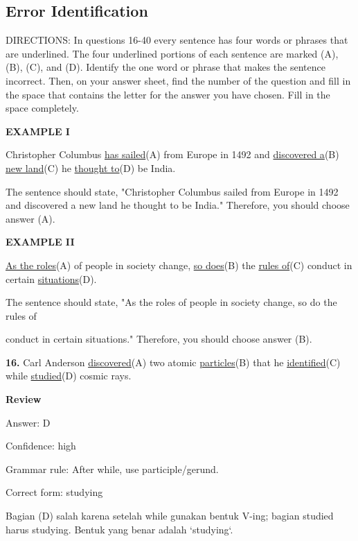 \documentclass[12pt]{article}
\begin{document}
\subsection*{Error Identification}
DIRECTIONS: In questions 16-40 every sentence has four words or phrases that are underlined. The four underlined portions of each sentence are marked (A), (B), (C), and (D). Identify the one word or phrase that makes the sentence incorrect. Then, on your answer sheet, find the number of the question and fill in the space that contains the letter for the answer you have chosen. Fill in the space completely.\par
\begin{exampleblock}
\textbf{EXAMPLE I}\par
Christopher Columbus \uline{has sailed}(A) from Europe in 1492 and \uline{discovered a}(B) \uline{new land}(C) he \uline{thought to}(D) be India.\par
The sentence should state, "Christopher Columbus sailed from Europe in 1492 and discovered a new land he thought to be India." Therefore, you should choose answer (A).\par
\end{exampleblock}
\begin{exampleblock}
\textbf{EXAMPLE II}\par
\uline{As the roles}(A) of people in society change, \uline{so does}(B) the \uline{rules of}(C) conduct in certain \uline{situations}(D).\par
The sentence should state, "As the roles of people in society change, so do the rules of\par
conduct in certain situations." Therefore, you should choose answer (B).\par
\end{exampleblock}
\noindent\textbf{16.} Carl Anderson \uline{discovered}(A) two atomic \uline{particles}(B) that he \uline{identified}(C) while \uline{studied}(D) cosmic rays.
\par
\begingroup
\setlength{\parskip}{0pt}
\setlength{\parindent}{0pt}
\textbf{Review}\par
Answer: D\par
Confidence: high\par
Grammar rule: After while, use participle/gerund.\par
Correct form: studying\par
Bagian (D) salah karena setelah while gunakan bentuk V-ing; bagian studied harus studying. Bentuk yang benar adalah `studying`.\par
\end{document}
